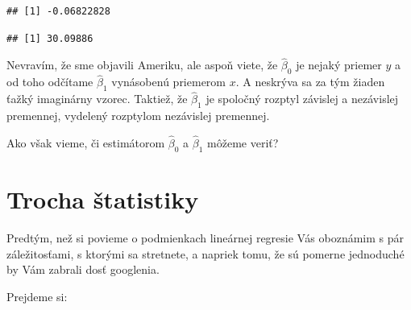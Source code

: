 \begin{verbatim}
## [1] -0.06822828
\end{verbatim}

\begin{Shaded}
\begin{Highlighting}[]

\StringTok{ }\OperatorTok{$}
\StringTok{ }\OperatorTok{$}

\StringTok{ }\OperatorTok{-}\StringTok{ }\OperatorTok{*}\StringTok{ }

\end{Highlighting}
\end{Shaded}

\begin{verbatim}
## [1] 30.09886
\end{verbatim}

\begin{Shaded}
\begin{Highlighting}[]
\end{Highlighting}
\end{Shaded}

Nevravím, že sme objavili Ameriku, ale aspoň viete, že \(\hat\beta_0\)
je nejaký priemer \(y\) a od toho odčítame \(\hat\beta_1\) vynásobenú
priemerom \(x\). A neskrýva sa za tým žiaden ťažký imaginárny vzorec.
Taktiež, že \(\hat\beta_1\) je spoločný rozptyl závislej a nezávislej
premennej, vydelený rozptylom nezávislej premennej.

Ako však vieme, či estimátorom \(\hat\beta_0\) a \(\hat\beta_1\) môžeme
veriť?

\newpage

\hypertarget{trocha-ux161tatistiky}{%
\section{Trocha štatistiky}\label{trocha-ux161tatistiky}}

Predtým, než si povieme o podmienkach lineárnej regresie Vás oboznámim s
pár záležitosťami, s ktorými sa stretnete, a napriek tomu, že sú pomerne
jednoduché by Vám zabrali dosť googlenia.

Prejdeme si:

